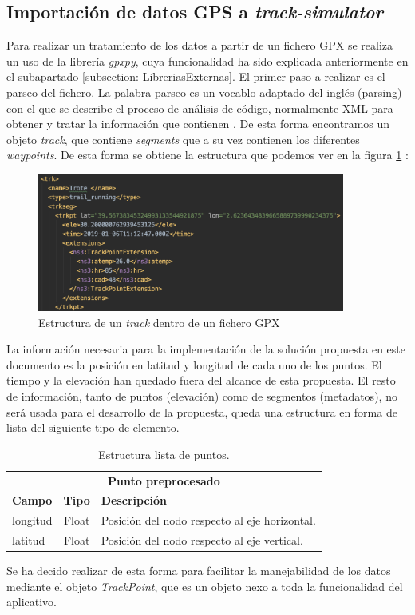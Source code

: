 \subsection{Importación de datos GPS a \textit{track-simulator}}
\label{section: ImportacionGPX}
Para realizar un tratamiento de los datos a partir de un fichero \ac{GPX} se realiza un 
uso de la librería \textit{gpxpy}, cuya funcionalidad ha sido explicada anteriormente en 
el subapartado \ref{subsection: LibreriasExternas}. El primer paso a realizar es el 
parseo del fichero. La palabra parseo es un vocablo adaptado del inglés (parsing) con el 
que se describe el proceso de análisis de código, normalmente XML para obtener y 
tratar la información que contienen \cite{Microsoft01}. De esta forma encontramos un 
objeto \textit{track}, que contiene \textit{segments} que a su vez contienen los 
diferentes \textit{waypoints}. De esta forma se obtiene la estructura que podemos ver 
en la figura \ref{figure:WayPointStructure} :
\begin{figure}[htb]
\begin{center}
\includegraphics[width=0.9\textwidth]{./Imagenes/WayPointStructure.png}
\caption{Estructura de un \textit{track} dentro de un fichero \ac{GPX}}
\label{figure:WayPointStructure}
\end{center}
\end{figure}
\newpage
La información necesaria para la implementación de la solución propuesta en este documento es la posición en latitud y longitud de cada uno de los puntos. El tiempo  y la elevación han quedado fuera del alcance de esta propuesta. El resto de información, tanto de puntos (elevación) como de segmentos (metadatos), no será usada para el desarrollo de la propuesta, queda una estructura en forma de lista del siguiente tipo 
de elemento.
\begin{table}[h]
\centering
\begin{tabular}{l | c | l} 
\toprule
\multicolumn{3}{c}{\textbf{Punto preprocesado}} \\ 
\cmidrule(r){1-3}
{\textbf{Campo}} &  {\textbf{Tipo}} & {\textbf{Descripción}} \\
\cmidrule(r){1-3}
{longitud}  & Float & Posición del nodo respecto al eje horizontal. \\
{latitud}  & Float & Posición del nodo respecto al eje vertical.\\
\bottomrule
\end{tabular}
\caption{Estructura lista de puntos.}
\label{TablaNodo}
\end{table}
\newpage
Se ha decido realizar de esta forma para facilitar la manejabilidad de los datos mediante el objeto 
\textit{TrackPoint}, que es un objeto nexo a toda la funcionalidad del aplicativo. 

